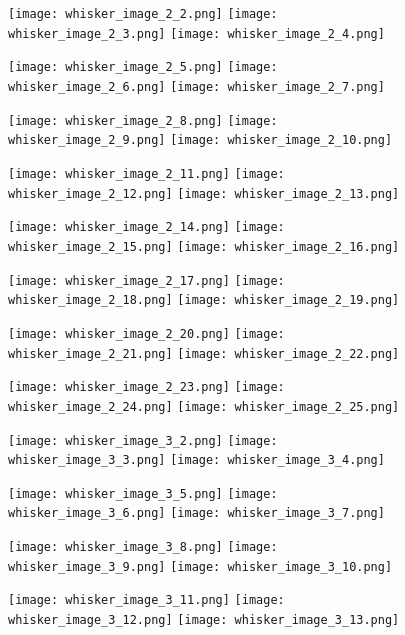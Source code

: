 \documentclass[12pt]{article}
\begin{document}
\begin{figure}
	\centerline{
		\texttt{[image: whisker\_image\_2\_2.png]}
		\texttt{[image: whisker\_image\_2\_3.png]}
		\texttt{[image: whisker\_image\_2\_4.png]}
	}
	\centerline{
		\texttt{[image: whisker\_image\_2\_5.png]}
		\texttt{[image: whisker\_image\_2\_6.png]}
		\texttt{[image: whisker\_image\_2\_7.png]}
	}
	\centerline{
		\texttt{[image: whisker\_image\_2\_8.png]}
		\texttt{[image: whisker\_image\_2\_9.png]}
		\texttt{[image: whisker\_image\_2\_10.png]}
	}
	\centerline{
		\texttt{[image: whisker\_image\_2\_11.png]}
		\texttt{[image: whisker\_image\_2\_12.png]}
		\texttt{[image: whisker\_image\_2\_13.png]}
	}
\end{figure}

\begin{figure}
	\centerline{
		\texttt{[image: whisker\_image\_2\_14.png]}
		\texttt{[image: whisker\_image\_2\_15.png]}
		\texttt{[image: whisker\_image\_2\_16.png]}
	}
	\centerline{
		\texttt{[image: whisker\_image\_2\_17.png]}
		\texttt{[image: whisker\_image\_2\_18.png]}
		\texttt{[image: whisker\_image\_2\_19.png]}
	}
	\centerline{
		\texttt{[image: whisker\_image\_2\_20.png]}
		\texttt{[image: whisker\_image\_2\_21.png]}
		\texttt{[image: whisker\_image\_2\_22.png]}
	}
	\centerline{
		\texttt{[image: whisker\_image\_2\_23.png]}
		\texttt{[image: whisker\_image\_2\_24.png]}
		\texttt{[image: whisker\_image\_2\_25.png]}
	}
\end{figure}

\begin{figure}
	\centerline{
		\texttt{[image: whisker\_image\_3\_2.png]}
		\texttt{[image: whisker\_image\_3\_3.png]}
		\texttt{[image: whisker\_image\_3\_4.png]}
	}
	\centerline{
		\texttt{[image: whisker\_image\_3\_5.png]}
		\texttt{[image: whisker\_image\_3\_6.png]}
		\texttt{[image: whisker\_image\_3\_7.png]}
	}
	\centerline{
		\texttt{[image: whisker\_image\_3\_8.png]}
		\texttt{[image: whisker\_image\_3\_9.png]}
		\texttt{[image: whisker\_image\_3\_10.png]}
	}
	\centerline{
		\texttt{[image: whisker\_image\_3\_11.png]}
		\texttt{[image: whisker\_image\_3\_12.png]}
		\texttt{[image: whisker\_image\_3\_13.png]}
	}
\end{figure}
\end{document}
